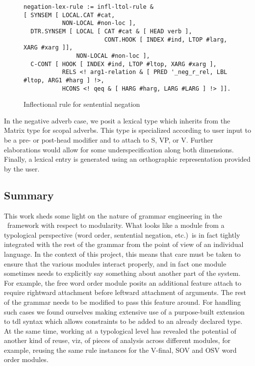 \begin{figure}[ht]
{\scriptsize
\begin{verbatim}
negation-lex-rule := infl-ltol-rule &
[ SYNSEM [ LOCAL.CAT #cat,
           NON-LOCAL #non-loc ],
  DTR.SYNSEM [ LOCAL [ CAT #cat & [ HEAD verb ],
                       CONT.HOOK [ INDEX #ind, LTOP #larg, XARG #xarg ]],
               NON-LOCAL #non-loc ],
  C-CONT [ HOOK [ INDEX #ind, LTOP #ltop, XARG #xarg ],
           RELS <! arg1-relation & [ PRED '_neg_r_rel, LBL #ltop, ARG1 #harg ] !>,
           HCONS <! qeq & [ HARG #harg, LARG #LARG ] !> ]].
\end{verbatim}
}
\caption{Inflectional rule for sentential negation}
\label{negrulefig}
\end{figure}

In the negative adverb case, we posit a lexical type which inherits
from the Matrix type for scopal adverbs.  This type is specialized
according to user input to be a pre- or post-head modifier and to
attach to S, VP, or V.  Further elaborations would allow for some
underspecification along both dimensions.  Finally, a lexical entry is
generated using an orthographic representation
provided by the user.

\subsection{Summary}

This work sheds some light on the nature of grammar engineering in the
\hpsg\ framework with respect to modularity.  What looks like a module
from a typological perspective (word order, sentential negation,
etc.)\ is in fact tightly integrated with the rest of the grammar from
the point of view of an individual language.  In the context of this
project, this means that care must be taken to ensure that the various
modules interact properly, and in fact one module sometimes needs to
explicitly say something about another part of the system.  For
example, the free word order module posits an additional feature {\sc
attach} to require rightward attachment before leftward attachment of
arguments.  The rest of the grammar needs to be modified to pass this
feature around.  For handling such cases we found ourselves making
extensive use of a purpose-built extension to tdl syntax which allows
constraints to be added to an already declared type.  At the same
time, working at a typological level has revealed 
the potential of another kind of reuse, viz, of
pieces of analysis across
different modules, for example, reusing the same rule instances for
the V-final, SOV and OSV word order modules.


